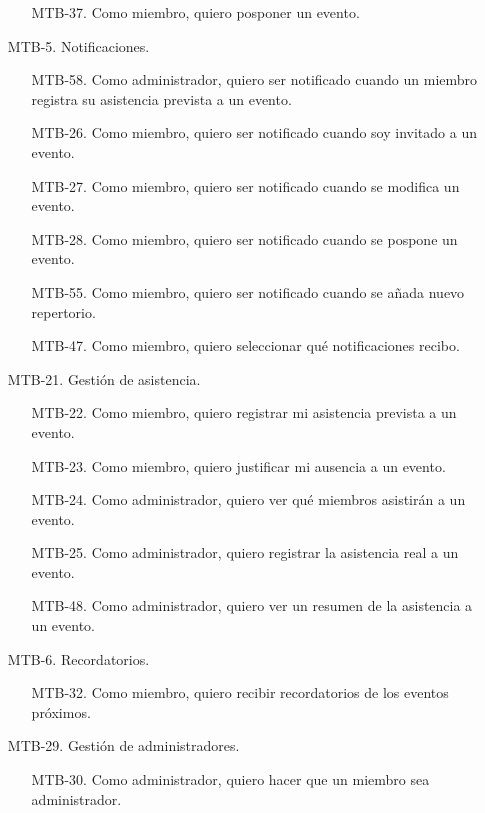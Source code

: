 \begin{enumerate}
\begin{enumerate}
            \item[MTB-37.] Como miembro, quiero posponer un evento.
        \end{enumerate}
    \item[MTB-5.] Notificaciones.
        \begin{enumerate}
            \item[MTB-58.] Como administrador, quiero ser notificado cuando un miembro registra su asistencia prevista a un evento.
            \item[MTB-26.] Como miembro, quiero ser notificado cuando soy invitado a un evento.
            \item[MTB-27.] Como miembro, quiero ser notificado cuando se modifica un evento.
            \item[MTB-28.] Como miembro, quiero ser notificado cuando se pospone un evento.
            \item[MTB-55.] Como miembro, quiero ser notificado cuando se añada nuevo repertorio.
            \item[MTB-47.] Como miembro, quiero seleccionar qué notificaciones recibo.
        \end{enumerate}
    \item[MTB-21.] Gestión de asistencia.
        \begin{enumerate}
            \item[MTB-22.] Como miembro, quiero registrar mi asistencia prevista a un evento.
            \item[MTB-23.] Como miembro, quiero justificar mi ausencia a un evento.
            \item[MTB-24.] Como administrador, quiero ver qué miembros asistirán a un evento.
            \item[MTB-25.] Como administrador, quiero registrar la asistencia real a un evento.
            \item[MTB-48.] Como administrador, quiero ver un resumen de la asistencia a un evento.
        \end{enumerate}
    \item[MTB-6.] Recordatorios.
        \begin{enumerate}
            \item[MTB-32.] Como miembro, quiero recibir recordatorios de los eventos próximos.
        \end{enumerate}
    \item[MTB-29.] Gestión de administradores.
        \begin{enumerate}
            \item[MTB-30.] Como administrador, quiero hacer que un miembro sea administrador.

\end{enumerate}
\end{enumerate}
